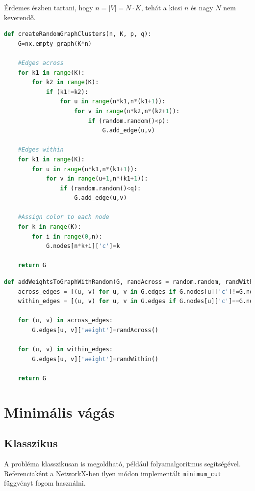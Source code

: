 Érdemes észben tartani, hogy $n=|V|=N \cdot K$, tehát a kicsi $n$ és nagy $N$ nem keverendő.

\newpage
\vspace{5pt}
\begin{lstlisting}[language=python,caption=Gráf generálása,label=code:graphGeneration]	
def createRandomGraphClusters(n, K, p, q):
	G=nx.empty_graph(K*n)
	
	#Edges across
	for k1 in range(K):
		for k2 in range(K):
			if (k1!=k2):
				for u in range(n*k1,n*(k1+1)):
					for v in range(n*k2,n*(k2+1)):
						if (random.random()<p):
							G.add_edge(u,v)
	
	#Edges within
	for k1 in range(K):
		for u in range(n*k1,n*(k1+1)):
			for v in range(u+1,n*(k1+1)):
				if (random.random()<q):
					G.add_edge(u,v)
	
	#Assign color to each node
	for k in range(K):
		for i in range(0,n):
			G.nodes[n*k+i]['c']=k
	
	return G	
\end{lstlisting}

\vspace{5pt}
\begin{lstlisting}[language=python,caption=Súlyok hozzáadása gráfhoz,label=code:graphAddWeights]	
def addWeightsToGraphWithRandom(G, randAcross = random.random, randWithin = random.random):
	across_edges = [(u, v) for u, v in G.edges if G.nodes[u]['c']!=G.nodes[v]['c']]
	within_edges = [(u, v) for u, v in G.edges if G.nodes[u]['c']==G.nodes[v]['c']]
	
	for (u, v) in across_edges:
		G.edges[u, v]['weight']=randAcross()
	
	for (u, v) in within_edges:
		G.edges[u, v]['weight']=randWithin()
		
	return G	
\end{lstlisting}

\section{Minimális vágás}


\subsection{Klasszikus}

A probléma klasszikusan is megoldható, például folyamalgoritmus segítségével. Referenciaként a NetworkX-ben ilyen módon implementált \verb+minimum_cut+ függvényt fogom használni.

